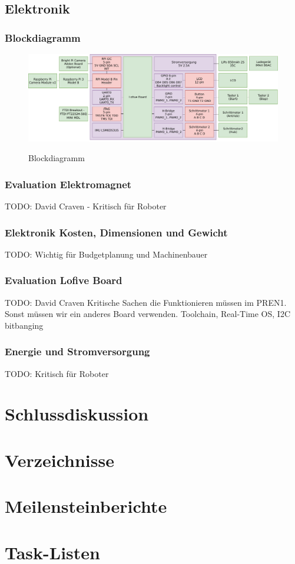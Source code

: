 \documentclass[a4paper]{report}
\begin{document}
\section{Elektronik}
\subsection{Blockdiagramm}
\begin{figure}[h!]
  \includegraphics[keepaspectratio,width=\textwidth]{BlockdiagrammElektronik}
  \label{fig:ElektronikBlockdiagramm}
  \caption{Blockdiagramm}
\end{figure}

\subsection{Evaluation Elektromagnet}
TODO: David Craven - Kritisch für Roboter

\subsection{Elektronik Kosten, Dimensionen und Gewicht}
TODO: Wichtig für Budgetplanung und Machinenbauer

\subsection{Evaluation Lofive Board}
TODO: David Craven
Kritische Sachen die Funktionieren müssen im PREN1. Sonst müssen wir ein anderes
Board verwenden.
Toolchain, Real-Time OS, I2C bitbanging

\subsection{Energie und Stromversorgung}
TODO: Kritisch für Roboter

\chapter{Schlussdiskussion}

\chapter*{Verzeichnisse}

\listoffigures

\listoftables

\printbibliography

\appendix

\chapter{Meilensteinberichte}

\chapter{Task-Listen}
\end{document}
